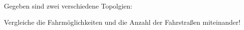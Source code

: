 

Gegeben sind zwei verschiedene Topolgien:


Vergleiche die Fahrmöglichkeiten und die Anzahl der Fahrstraßen miteinander!
